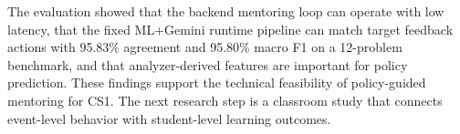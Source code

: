 \documentclass[conference]{IEEEtran}
\begin{document}
The evaluation showed that the backend mentoring loop can operate with low latency, that the fixed ML+Gemini runtime pipeline can match target feedback actions with 95.83\% agreement and 95.80\% macro F1 on a 12-problem benchmark, and that analyzer-derived features are important for policy prediction. These findings support the technical feasibility of policy-guided mentoring for CS1. The next research step is a classroom study that connects event-level behavior with student-level learning outcomes.

\nocite{Francisco2022}
\nocite{Chrysafiadi2022}
\nocite{pankiewicz2023largelanguagemodelsgpt}
\nocite{AutomatedAssessmentToolsForGrading2022}
\nocite{FeedbackSystemSupportingStudents2022}
\nocite{EvaluationofLLMtoolsforfeedbackgeneration}
\nocite{AutomatingHumanTutorStyleProgrammingFeedback}
\nocite{AITutoringinSDEducation}


\end{document}
